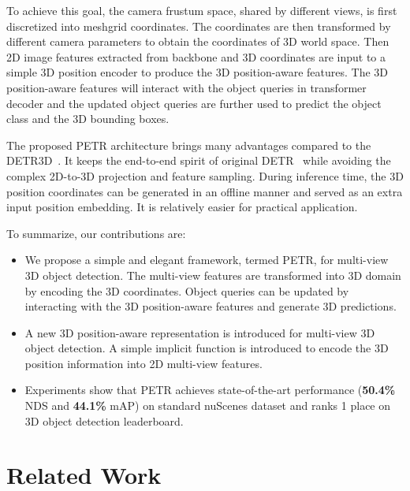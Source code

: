 \documentclass[runningheads]{llncs}
\begin{document}
To achieve this goal, the camera frustum space, shared by different views, is first discretized into meshgrid coordinates. The coordinates are then transformed by different camera parameters to obtain the coordinates of 3D world space. 
Then 2D image features extracted from backbone and 3D coordinates are input to a simple 3D position encoder to produce the 3D position-aware features.
The 3D position-aware features will interact with the object queries in transformer decoder and the updated object queries are further used to predict the object class and the 3D bounding boxes.  

The proposed PETR architecture brings many advantages compared to the DETR3D~\cite{wang2022detr3d}. It keeps the end-to-end spirit of original DETR~\cite{carion2020detr} while avoiding the complex 2D-to-3D projection and feature sampling. During inference time, the 3D position coordinates can be generated in an offline manner and served as an extra input position embedding. It is relatively easier for practical application.

To summarize, our contributions are:
\begin{itemize}
\item We propose a simple and elegant framework, termed PETR, for multi-view 3D object detection. The multi-view features are transformed into 3D domain by encoding the 3D coordinates. Object queries can be updated by interacting with the 3D position-aware features and generate 3D predictions.
\item A new 3D position-aware representation is introduced for multi-view 3D object detection. A simple implicit function is introduced to encode the 3D position information into 2D multi-view features.
\item Experiments show that PETR achieves state-of-the-art performance (\textbf{50.4\%} NDS and \textbf{44.1\%} mAP) on standard nuScenes dataset and ranks 1 place on 3D object detection leaderboard. 
\end{itemize}
\section{Related Work}
\end{document}
